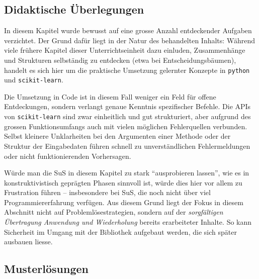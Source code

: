 \subsection*{Didaktische Überlegungen}

In diesem Kapitel wurde bewusst auf eine grosse Anzahl entdeckender Aufgaben verzichtet. Der Grund dafür liegt in der Natur des behandelten Inhalts: Während viele frühere Kapitel dieser Unterrichtseinheit dazu einluden, Zusammenhänge und Strukturen selbständig zu entdecken (etwa bei Entscheidungsbäumen), handelt es sich hier um die praktische Umsetzung gelernter Konzepte in \texttt{python} und \texttt{scikit-learn}.

Die Umsetzung in Code ist in diesem Fall weniger ein Feld für offene Entdeckungen, sondern verlangt genaue Kenntnis spezifischer Befehle. Die APIs von \texttt{scikit-learn} sind zwar einheitlich und gut strukturiert, aber aufgrund des grossen Funktionsumfangs auch mit vielen möglichen Fehlerquellen verbunden. Selbst kleinere Unklarheiten bei den Argumenten einer Methode oder der Struktur der Eingabedaten führen schnell zu unverständlichen Fehlermeldungen oder nicht funktionierenden Vorhersagen.

Würde man die SuS in diesem Kapitel zu stark ``ausprobieren lassen'', wie es in konstruktivistisch geprägten Phasen sinnvoll ist, würde dies hier vor allem zu Frustration führen – insbesondere bei SuS, die noch nicht über viel Programmiererfahrung verfügen. Aus diesem Grund liegt der Fokus in diesem Abschnitt nicht auf Problemlösestrategien, sondern auf der \emph{sorgfältigen Übertragung Anwendung und Wiederholung} bereits erarbeiteter Inhalte. So kann Sicherheit im Umgang mit der Bibliothek aufgebaut werden, die sich später ausbauen liesse.


\subsection*{Musterlösungen}

